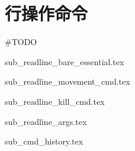 \section{行操作命令}

\#TODO

{sub_readline_bare_essential.tex}

{sub_readline_movement_cmd.tex}

{sub_readline_kill_cmd.tex}

{sub_readline_args.tex}

{sub_cmd_history.tex}
